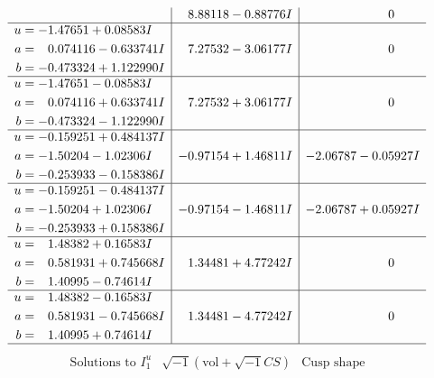 \documentclass[1p]{elsarticle_modified}
\theoremstyle{definition}
\newcommand{\I}{\sqrt{-1}}
\begin{document}
$$\begin{array}{c|c|c}
 & \phantom{-}8.88118 - 0.88776 I & \phantom{-0.000000 } 0 \\ \hline\begin{aligned}
u &= -1.47651 + 0.08583 I \\
a &= \phantom{-}0.074116 - 0.633741 I \\
b &= -0.473324 + 1.122990 I\end{aligned}
 & \phantom{-}7.27532 - 3.06177 I & \phantom{-0.000000 } 0 \\ \hline\begin{aligned}
u &= -1.47651 - 0.08583 I \\
a &= \phantom{-}0.074116 + 0.633741 I \\
b &= -0.473324 - 1.122990 I\end{aligned}
 & \phantom{-}7.27532 + 3.06177 I & \phantom{-0.000000 } 0 \\ \hline\begin{aligned}
u &= -0.159251 + 0.484137 I \\
a &= -1.50204 - 1.02306 I \\
b &= -0.253933 - 0.158386 I\end{aligned}
 & -0.97154 + 1.46811 I & -2.06787 - 0.05927 I \\ \hline\begin{aligned}
u &= -0.159251 - 0.484137 I \\
a &= -1.50204 + 1.02306 I \\
b &= -0.253933 + 0.158386 I\end{aligned}
 & -0.97154 - 1.46811 I & -2.06787 + 0.05927 I \\ \hline\begin{aligned}
u &= \phantom{-}1.48382 + 0.16583 I \\
a &= \phantom{-}0.581931 + 0.745668 I \\
b &= \phantom{-}1.40995 - 0.74614 I\end{aligned}
 & \phantom{-}1.34481 + 4.77242 I & \phantom{-0.000000 } 0 \\ \hline\begin{aligned}
u &= \phantom{-}1.48382 - 0.16583 I \\
a &= \phantom{-}0.581931 - 0.745668 I \\
b &= \phantom{-}1.40995 + 0.74614 I\end{aligned}
 & \phantom{-}1.34481 - 4.77242 I & \phantom{-0.000000 } 0\\
 \hline 
 \end{array}$$\newpage$$\begin{array}{c|c|c}  
\text{Solutions to }I^u_{1}& \I (\text{vol} + \sqrt{-1}CS) & \text{Cusp shape}\\

\end{array}$$
\end{document}
